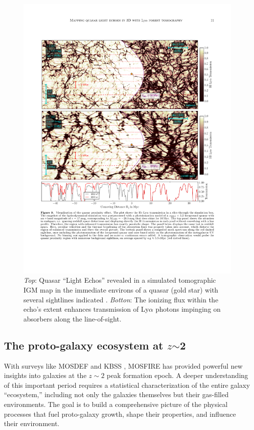 \begin{figure}[h!]
%
\vskip -0.1in
%
\includegraphics[width=\textwidth]{figs/qso_LightEcho_v1.pdf}
%
\caption{{\it Top}: Quasar ``Light Echos'' revealed in a simulated tomographic IGM map in the immediate environs of a quasar (gold star) with several sightlines indicated \citep[from][]{2018arXiv181005156S}.  {\it Botton}: The ionizing flux within the echo's extent enhances transmission of Ly$\alpha$ photons impinging on absorbers along the line-of-sight.}
%
\label{fig:LightEcho}
%
\end{figure}


\subsection{The proto-galaxy ecosystem at $z$$\sim$2}
\label{sec:z2galaxies}

With surveys like MOSDEF \citep{kriek15} and KBSS \citep[e.g.,][]{steidel14}, MOSFIRE has provided powerful new
insights into galaxies at the $z \sim 2$ peak formation epoch.  A deeper understanding of this important period
requires a statistical characterization of the entire galaxy ``ecosystem,'' including not only the galaxies themselves
but their gas-filled environments.  The goal is to build a comprehensive picture of the physical processes that fuel
proto-galaxy growth, shape their properties, and influence their environment.

